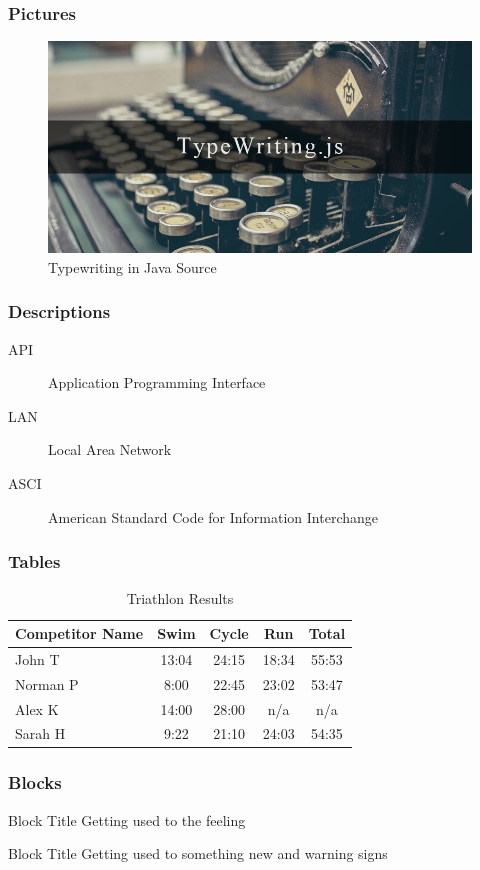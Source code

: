 \documentclass{beamer}
\begin{document}
\begin{frame}
\frametitle{Pictures}
\begin{figure}
\includegraphics[scale=0.4]{cover.jpg}
\caption{Typewriting in Java Source}
\end{figure}
\end{frame}

\begin{frame}
\frametitle{Descriptions}
\begin{description}
\item[API] Application Programming Interface
\item[LAN] Local Area Network
\item[ASCI] American Standard Code for Information Interchange
\end{description}
\end{frame}

\begin{frame}
\frametitle{Tables}
\begin{table}
\begin{tabular}{l | c | c | c | c }
Competitor Name & Swim & Cycle & Run & Total \\
\hline \hline
John T & 13:04 & 24:15 & 18:34 & 55:53 \\ 
Norman P & 8:00 & 22:45 & 23:02 & 53:47 \\
Alex K & 14:00 & 28:00 & n/a & n/a \\ 
Sarah H & 9:22 & 21:10 & 24:03 & 54:35 
\end{tabular}
\caption{Triathlon Results}
\end{table}
\end{frame}

\begin{frame}
\frametitle{Blocks}
\begin{block}{Block Title}
Getting used to the feeling
\end{block}
\begin{alertblock}{Block Title}
Getting used to something new and warning signs
\end{alertblock}
\end{frame}
\end{document}

